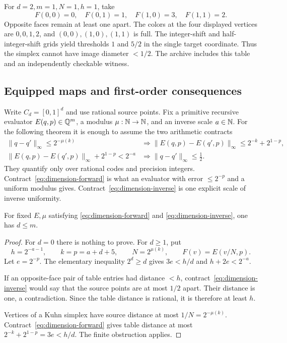 For $d=2,m=1,N=1,h=1$, take
\[
 F(0,0)=0,\quad F(0,1)=1,\quad F(1,0)=3,\quad F(1,1)=2.
\]
Opposite faces remain at least one apart. The colors at the four displayed vertices are $0,0,1,2$, and $(0,0),(1,0),(1,1)$ is full. The integer-shift and half-integer-shift grids yield thresholds $1$ and $5/2$ in the single target coordinate. Thus the simplex cannot have image diameter $<1/2$. The archive includes this table and an independently checkable witness.

\subsection{Equipped maps and first-order consequences}

Write $C_d=[0,1]^d$ and use rational source points. Fix a primitive recursive evaluator
$E(q,p)\in\mathbb Q^m$, a modulus $\mu:\mathbb N\to\mathbb N$, and an inverse scale $a\in\mathbb N$. For the following theorem it is enough to assume the two arithmetic contracts
\begin{align}
 \|q-q'\|_\infty\leq2^{-\mu(k)}
 &\Longrightarrow
 \|E(q,p)-E(q',p)\|_\infty
       \leq2^{-k}+2^{1-p}, \label{eq:dimension-forward}\\
 \|E(q,p)-E(q',p)\|_\infty+2^{1-p}<2^{-a}
 &\Longrightarrow \|q-q'\|_\infty\leq\tfrac12 .
 \label{eq:dimension-inverse}
\end{align}
They quantify only over rational codes and precision integers. Contract~\eqref{eq:dimension-forward} is what an evaluator with error $\leq2^{-p}$ and a uniform modulus gives. Contract~\eqref{eq:dimension-inverse} is one explicit scale of inverse uniformity.

\begin{theorem}\label{thm:dimension-schema}
For fixed $E,\mu$ satisfying \eqref{eq:dimension-forward} and \eqref{eq:dimension-inverse}, one has $d\leq m$.
\end{theorem}
\begin{proof}
For $d=0$ there is nothing to prove. For $d\geq1$, put
\[
 h=2^{-a-1},\qquad k=p=a+d+5,\qquad N=2^{\mu(k)},
 \qquad F(v)=E(v/N,p).
\]
Let $e=2^{-p}$. The elementary inequality $2^d\geq d$ gives
$3e<h/d$ and $h+2e<2^{-a}$.

If an opposite-face pair of table entries had distance $<h$, contract~\eqref{eq:dimension-inverse} would say that the source points are at most $1/2$ apart. Their distance is one, a contradiction. Since the table distance is rational, it is therefore at least $h$.

Vertices of a Kuhn simplex have source distance at most $1/N=2^{-\mu(k)}$. Contract~\eqref{eq:dimension-forward} gives table distance at most $2^{-k}+2^{1-p}=3e<h/d$. The finite obstruction applies.
\end{proof}

